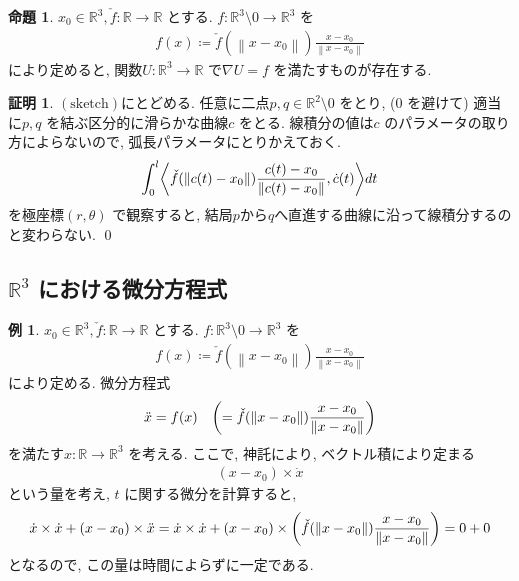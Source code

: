 \documentclass[10pt, fleqn, label-section=none]{bxjsarticle}
\theoremstyle{definition}
\newtheorem{ex}[dfn]{例}
\newtheorem{prop}[dfn]{命題}
\newtheorem*{pf*}{証明}
\newcommand{\paren}[1]{\mleft( #1\mright )}
\newcommand{\tbra}[1]{\mleft\langle#1\mright\rangle}
\newcommand{\norm}[1]{\left\|#1\right\|}
\renewcommand{\;}{\, ; \,}
\begin{document}
\begin{prop} $ x_0 \in \mathbb R^3, \check{f}: \mathbb R \rightarrow \mathbb R$ とする. $f: \mathbb R^3 \setminus 0 \rightarrow \mathbb R^3$ を
\begin{align*} f(x) \coloneqq \check{f}(\norm{x- x_0}) \frac{x- x_0}{\norm{x- x_0}} \end{align*}
により定めると, 関数$U: \mathbb R^3 \rightarrow \mathbb R$ で$\nabla U = f$ を満たすものが存在する. 

\end{prop}
\begin{pf*}$(\textrm{sketch})$にとどめる.
任意に二点$p,q \in \mathbb R^2 \setminus 0$ をとり, ($0$ を避けて) 適当に$p,q$ を結ぶ区分的に滑らかな曲線$c$ をとる. 線積分の値は$c$ のパラメータの取り方によらないので, 弧長パラメータにとりかえておく.
\begin{align*} \int_0^l \tbra{\check{f} (\norm{c(t) - x_0}) \frac{c(t) - x_0}{\norm{c(t) - x_0} } , \dot c (t)} dt \end{align*} 
を極座標$(r, \theta)$ で観察すると, 結局$p$から$q$へ直進する曲線に沿って線積分するのと変わらない. 
\qed
\end{pf*}



\subsection{$\mathbb R^3$ における微分方程式}

\begin{ex} $ x_0 \in \mathbb R^3, \check{f}: \mathbb R \rightarrow \mathbb R$ とする. $f: \mathbb R^3 \setminus 0 \rightarrow \mathbb R^3$ を
\begin{align*} f(x) \coloneqq \check{f}(\norm{x- x_0}) \frac{x- x_0}{\norm{x- x_0}} \end{align*}
により定める. 微分方程式
\begin{align*} \ddot x = f(x) \quad \paren{= \check{f}(\norm{x- x_0}) \frac{x- x_0}{\norm{x- x_0}} } \end{align*}
を満たす$x: \mathbb R \rightarrow \mathbb R^3$ を考える. ここで, 神託により, ベクトル積により定まる
\begin{align*}  (x - x_0) \times \dot x \end{align*}
という量を考え, $t$ に関する微分を計算すると, 
\begin{align*} \dot x \times \dot x + (x - x_0) \times \ddot x =  \dot x \times \dot x + (x - x_0) \times  \paren{\check{f}(\norm{x- x_0}) \frac{x- x_0}{\norm{x- x_0}} } = 0 + 0  \end{align*}
となるので, この量は時間によらずに一定である.
\end{ex}
\end{document}
